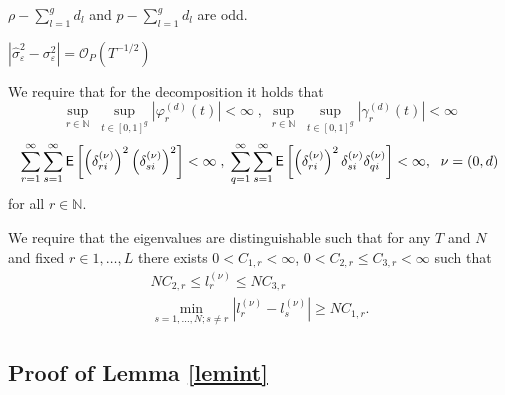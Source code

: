 \begin{assumptions}
\label{A4}
$\rho- \sum_{l=1}^g d_l$ and $p -\sum_{l=1}^g d_l$ are odd.
\end{assumptions}
\begin{assumptions}
\label{A4.1}
$|\hat{\sigma}_{\varepsilon}^2-\sigma_{\varepsilon}^2|=\mathcal{O}_P(T^{-1/2}) $
\end{assumptions}
\begin{assumptions}
\label{A5} 
We require that for the decomposition it holds that 
\begin{equation}\label{cc1}
\underset{r\in \mathbb{N}}{\operatorname{sup}} \; \underset{t \in [0,1]^g}{\operatorname{sup}} | \varphi^{(d)}_r(t)| < \infty \;,\; \underset{r\in \mathbb{N}}{\operatorname{sup}} \; \underset{t \in [0,1]^g}{\operatorname{sup}} | \gamma^{(d)}_r(t)| < \infty
\end{equation}
\begin{equation}\label{cc2}
\sum_{r=1}^\infty \sum_{s=1}^\infty \mathop{\mbox{\sf E}} \left[\left(\delta^{(\nu)}_{ri}\right)^2 \left(\delta^{(\nu)}_{si}\right)^2 \right] < \infty \;,\; \sum_{q=1}^\infty \sum_{s=1}^\infty \mathop{\mbox{\sf E}} \left[\left(\delta^{(\nu)}_{ri}\right)^2 \delta^{(\nu)}_{si} \delta^{(\nu)}_{qi}\right] < \infty, \; \ \nu=(0,d)
\end{equation}
for all $r\in \mathbb{N}$.
\end{assumptions}
\begin{assumptions} 
\label{A6}
 We require that the eigenvalues are distinguishable such that for any $T$ and $N$ and fixed $r \in{1,\dots,L}$ there exists $0<C_{1,r}<\infty$, $0 < C_{2,r} \leq C_{3,r} < \infty $ such that
\begin{equation}
\label{eigeval}
\begin{split}
N C_{2,r} \leq l^{(\nu)}_r \leq N C_{3,r} \\
\min_{s=1,\dots,N ; s \neq r} |l^{(\nu)}_r-l^{(\nu)}_s|\geq N C_{1,r}.
\end{split}
\end{equation}
\end{assumptions}

\subsection{Proof of Lemma \ref{lemint} } 
\label{prooflemma}
